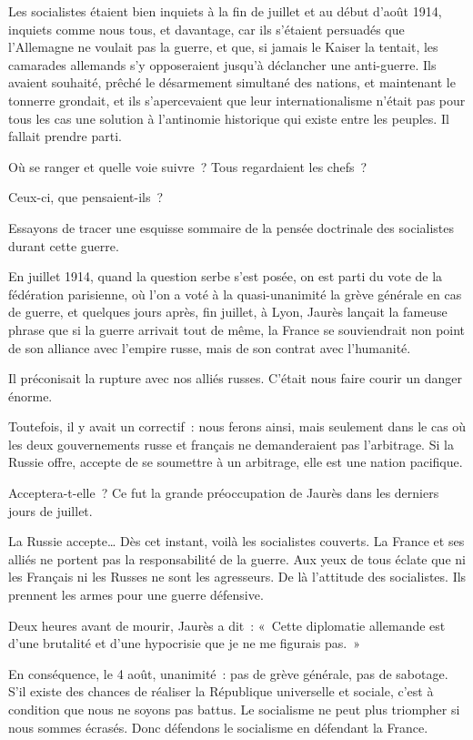\documentclass[french,twoside]{book} %
\newcommand\chaptercont{} %
\begin{document}
\chaptercont
\noindent Les socialistes étaient bien inquiets à la fin de juillet et au début d’août 1914, inquiets comme nous tous, et davantage, car ils s’étaient persuadés que l’Allemagne ne voulait pas la guerre, et que, si jamais le Kaiser la tentait, les camarades allemands s’y opposeraient jusqu’à déclancher une anti-guerre. Ils avaient souhaité, prêché le désarmement simultané des nations, et maintenant le tonnerre grondait, et ils s’apercevaient que leur internationalisme n’était pas pour tous les cas une solution à l’antinomie historique qui existe entre les peuples. Il fallait prendre parti.‌\par
Où se ranger et quelle voie suivre ? Tous regardaient les chefs ?‌\par
Ceux-ci, que pensaient-ils ?‌\par
Essayons de tracer une esquisse sommaire de la pensée doctrinale des socialistes durant cette guerre.‌\par
En juillet 1914, quand la question serbe s’est posée, on est parti du vote de la fédération parisienne, où l’on a voté à la quasi-unanimité la grève générale en cas de guerre, et quelques jours après, fin juillet, à Lyon, Jaurès lançait la fameuse phrase que si la guerre arrivait tout de même, la France se souviendrait non point de son alliance avec l’empire russe, mais de son contrat avec l’humanité.‌\par
Il préconisait la rupture avec nos alliés russes. C’était nous faire courir un danger énorme.‌\par
Toutefois, il y avait un correctif : nous ferons ainsi, mais seulement dans le cas où les deux gouvernements russe et français ne demanderaient pas l’arbitrage. Si la Russie offre, accepte de se soumettre à un arbitrage, elle est une nation pacifique.‌\par
Acceptera-t-elle ? Ce fut la grande préoccupation de Jaurès dans les derniers jours de juillet.‌\par
La Russie accepte… Dès cet instant, voilà les socialistes couverts. La France et ses alliés ne portent pas la responsabilité de la guerre. Aux yeux de tous éclate que ni les Français ni les Russes ne sont les agresseurs. De là l’attitude des socialistes. Ils prennent les armes pour une guerre défensive.‌\par
Deux heures avant de mourir, Jaurès a dit : « Cette diplomatie allemande est d’une brutalité et d’une hypocrisie que je ne me figurais pas. »‌\par
En conséquence, le 4 août, unanimité : pas de grève générale, pas de sabotage. S’il existe des chances de réaliser la République universelle et sociale, c’est à condition que nous ne soyons pas battus. Le socialisme ne peut plus triompher si nous sommes écrasés. Donc défendons le socialisme en défendant la France.‌\par
\end{document}
